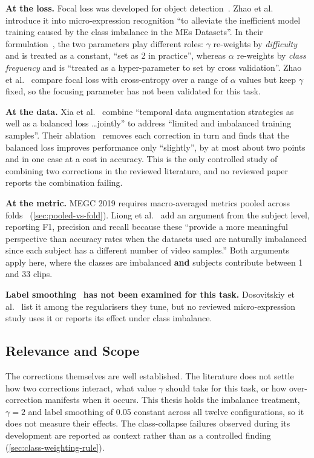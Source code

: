\textbf{At the loss.} Focal loss was developed for object detection~\cite{lin2017}. Zhao et al.~\cite{zhaoS2021} introduce it into micro-expression recognition ``to alleviate the inefficient model training caused by the class imbalance in the MEs Datasets''. In their formulation~\cite{zhaoS2021}, the two parameters play different roles: $\gamma$ re-weights by \textit{difficulty} and is treated as a constant, ``set as 2 in practice'', whereas $\alpha$ re-weights by \textit{class frequency} and is ``treated as a hyper-parameter to set by cross validation''. Zhao et al.~\cite{zhaoS2021} compare focal loss with cross-entropy over a range of $\alpha$ values but keep $\gamma$ fixed, so the focusing parameter has not been validated for this task.

\textbf{At the data.} Xia et al.~\cite{xia2020a} combine ``temporal data augmentation strategies as well as a balanced loss \ldots jointly'' to address ``limited and imbalanced training samples''. Their ablation~\cite{xia2020a} removes each correction in turn and finds that the balanced loss improves performance only ``slightly'', by at most about two points and in one case at a cost in accuracy. This is the only controlled study of combining two corrections in the reviewed literature, and no reviewed paper reports the combination failing.

\textbf{At the metric.} MEGC 2019 requires macro-averaged metrics pooled across folds~\cite{see2019} (\autoref{sec:pooled-vs-fold}). Liong et al.~\cite{liong2016} add an argument from the subject level, reporting F1, precision and recall because these ``provide a more meaningful perspective than accuracy rates when the datasets used are naturally imbalanced since each subject has a different number of video samples.'' Both arguments apply here, where the classes are imbalanced \textbf{and} subjects contribute between 1 and 33 clips.

\textbf{Label smoothing}~\cite{szegedy2016} \textbf{has not been examined for this task.} Dosovitskiy et al.~\cite{dosovitskiy2021} list it among the regularisers they tune, but no reviewed micro-expression study uses it or reports its effect under class imbalance.

\subsection{Relevance and Scope}
\label{sec:imbalance-gap}

The corrections themselves are well established. The literature does not settle how two corrections interact, what value $\gamma$ should take for this task, or how over-correction manifests when it occurs. This thesis holds the imbalance treatment, $\gamma = 2$ and label smoothing of 0.05 constant across all twelve configurations, so it does not measure their effects. The class-collapse failures observed during its development are reported as context rather than as a controlled finding (\autoref{sec:class-weighting-rule}).


